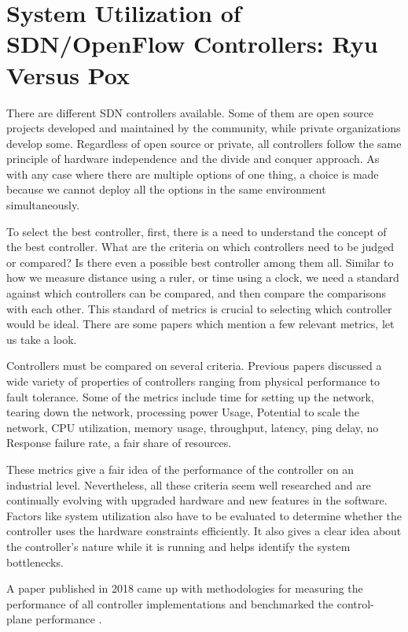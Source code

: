 \chapter{System Utilization of SDN/OpenFlow Controllers: Ryu Versus Pox}

    There are different SDN controllers available. Some of them are open source projects developed and maintained by the community, while private organizations develop some. Regardless of open source or private, all controllers follow the same principle of hardware independence and the divide and conquer approach. As with any case where there are multiple options of one thing, a choice is made because we cannot deploy all the options in the same environment simultaneously.
 
    To select the best controller, first, there is a need to understand the concept of the best controller. What are the criteria on which controllers need to be judged or compared? Is there even a possible best controller among them all. Similar to how we measure distance using a ruler, or time using a clock, we need a standard against which controllers can be compared, and then compare the comparisons with each other. This standard of metrics is crucial to selecting which controller would be ideal. There are some papers which mention a few relevant metrics, let us take a look.
    
    Controllers must be compared on several criteria. Previous papers discussed a wide variety of properties of controllers ranging from physical performance to fault tolerance. Some of the metrics include time for setting up the network, tearing down the network, processing power Usage, Potential to scale the network, CPU utilization, memory usage, throughput, latency, ping delay, no Response failure rate, a fair share of resources.
    
    These metrics give a fair idea of the performance of the controller on an industrial level. Nevertheless, all these criteria seem well researched and are continually evolving with upgraded hardware and new features in the software. Factors like system utilization also have to be evaluated to determine whether the controller uses the hardware constraints efficiently. It also gives a clear idea about the controller's nature while it is running and helps identify the system bottlenecks.
    
    A paper published in 2018 came up with methodologies for measuring the performance of all controller implementations and benchmarked the control- plane performance \cite{rfc8456}.
    
